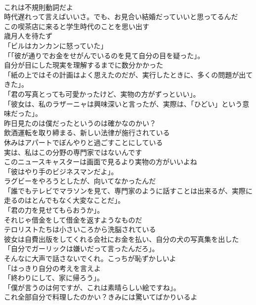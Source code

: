 \documentclass[8pt]{extreport}
\begin{document}
\begin{CJK}{UTF8}{min}
\\	これは不規則動詞だよ	
\\	時代遅れって言えばいいさ。でも、お見合い結婚だっていいと思ってるんだ	
\\	この喫茶店に来ると学生時代のことを思い出す	
\\	歳月人を待たず	
\\	「ビルはカンカンに怒っていた」	
\\	「「彼が通りでお金をせがんでいるのを見て自分の目を疑った」。	
\\	自分が目にした現実を理解するまでに数分かかった	
\\	「紙の上ではその計画はよく思えたのだが、実行したときに、多くの問題が出てきた」。	
\\	「君の写真とっても可愛かったけど、実物の方がずっといい」。	
\\	「彼女は、私のラザーニャは興味深いと言ったが、実際は、「ひどい」という意味だった」。	
\\	昨日見たのは僕だったというのは確かなのかい？	
\\	飲酒運転を取り締まる、新しい法律が施行されている	
\\	休みはアパートでぼんやりと過ごすことにしている	
\\	実は、私はこの分野の専門家ではないんです	
\\	このニュースキャスターは画面で見るより実物の方がいいよね	
\\	「彼はやり手のビジネスマンだよ」。	
\\	ラグビーをやろうとしたが、向いてなかったんだ	
\\	「誰でもテレビでマラソンを見て、専門家のように話すことは出来るが、実際に走るのはとんでもなく大変なことだ」。	
\\	「君の力を見せてもらおうか」。	
\\	それじゃ借金をして借金を返すようなものだ	
\\	テロリストたちは小さいころから洗脳されている	
\\	彼女は自費出版をしてくれる会社にお金を払い、自分の犬の写真集を出した	
\\	「自分でガーリックは嫌いだって言ったんだろ」。	
\\	そんなに大声で話さないでくれ。こっちが恥ずかしいよ	
\\	「はっきり自分の考えを言えよ	
\\	「終わりにして、家に帰ろう」。	
\\	「僕が言うのは何ですが、これは素晴らしい絵ですね」。	
\\	これ全部自分で料理したのかい？きみには驚いてばかりいるよ	

\end{CJK}
\end{document}
